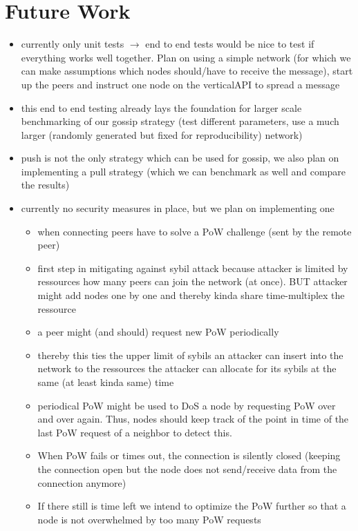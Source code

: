 \documentclass[a4paper,english,10pt,NET]{tumarticle}
\newcommand{\tos}{$\to$\xspace}
\begin{document}
\section{Future Work} \label{sec:future}
\begin{itemize}
	\item currently only unit tests \tos end to end tests would be nice to test if everything works well together. Plan on using a simple network (for which we can make assumptions which nodes should/have to receive the message), start up the peers and instruct one node on the verticalAPI to spread a message
	\item this end to end testing already lays the foundation for larger scale benchmarking of our gossip strategy (test different parameters, use a much larger (randomly generated but fixed for reproducibility) network)
	\item push is not the only strategy which can be used for gossip, we also plan on implementing a pull strategy (which we can benchmark as well and compare the results)
	\item currently no security measures in place, but we plan on implementing one
		\begin{itemize}
			\item when connecting peers have to solve a PoW challenge (sent by the remote peer)
			\item first step in mitigating against sybil attack because attacker is limited by ressources how many peers can join the network (at once). BUT attacker might add nodes one by one and thereby kinda share time-multiplex the ressource
			\item a peer might (and should) request new PoW periodically
			\item thereby this ties the upper limit of sybils an attacker can insert into the network to the ressources the attacker can allocate for its sybils at the same (at least kinda same) time
			\item periodical PoW might be used to DoS a node by requesting PoW over and over again. Thus, nodes should keep track of the point in time of the last PoW request of a neighbor to detect this.
			\item When PoW fails or times out, the connection is silently closed (keeping the connection open but the node does not send/receive data from the connection anymore)
			\item If there still is time left we intend to optimize the PoW further so that a node is not overwhelmed by too many PoW requests
		\end{itemize}
\end{itemize}
\end{document}
